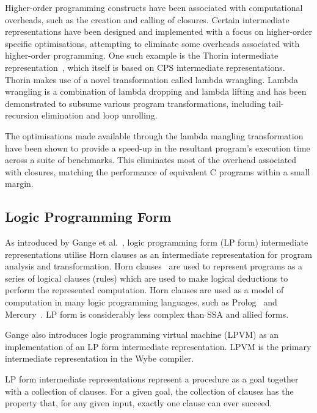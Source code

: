 Higher-order programming constructs have been associated with computational overheads, such as the creation and calling of closures. Certain intermediate representations have been designed and implemented with a focus on higher-order specific optimisations, attempting to eliminate some overheads associated with higher-order programming. One such example is the Thorin intermediate representation~\cite{leissa2015graph}, which itself is based on CPS intermediate representations. Thorin makes use of a novel transformation called lambda wrangling. Lambda wrangling is a combination of lambda dropping and lambda lifting and has been demonstrated to subsume various program transformations, including tail-recursion elimination and loop unrolling.

The optimisations made available through the lambda mangling transformation have been shown to provide a speed-up in the resultant program's execution time across a suite of benchmarks. This eliminates most of the overhead associated with closures, matching the performance of equivalent C programs within a small margin. 

\subsection{Logic Programming Form}
\label{ssec:lit-review--lp-form}

As introduced by Gange et al.~\cite{gange2015horn}, logic programming form (LP form) intermediate representations utilise Horn clauses as an intermediate representation for program analysis and transformation. Horn clauses~\cite{horn1951sentences} are used to represent programs as a series of logical clauses (rules) which are used to make logical deductions to perform the represented computation. Horn clauses are used as a model of computation in many logic programming languages, such as Prolog~\cite{colmerauer1993prolog} and Mercury~\cite{somogyi1996execution}. LP form is considerably less complex than SSA and allied forms. 

Gange also introduces logic programming virtual machine (LPVM) as an implementation of an LP form intermediate representation. LPVM is the primary intermediate representation in the Wybe compiler.

LP form intermediate representations represent a procedure as a goal together with a collection of clauses. For a given goal, the collection of clauses has the property that, for any given input, exactly one clause can ever succeed. 

